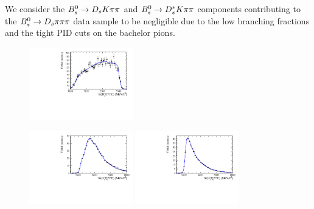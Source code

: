 We consider the ${{B}^0_{s}}\rightarrow D_s K{\pi}{\pi}$ and ${{B}^0_{s}}\rightarrow D_s^{*}K{\pi}{\pi}$ components contributing to the ${{B}^0_{s}}\rightarrow D_s \pi{\ensuremath{\pi}}{\ensuremath{\pi}}$ data sample to be negligible 
due to the low branching fractions and the tight PID cuts on the bachelor pions.

\begin{figure}[b]
\centering
\includegraphics[height=!,width=0.4\textwidth]{figs/MassFit/BkgShape/Bs2Dsstartpipipi.pdf}

\includegraphics[height=!,width=0.4\textwidth]{figs/MassFit/BkgShape/Bs2Dspipipi_as_DsKpipi_Run1.pdf}
\includegraphics[height=!,width=0.4\textwidth]{figs/MassFit/BkgShape/Bs2Dspipipi_as_DsKpipi_Run2.pdf}


\end{figure}
